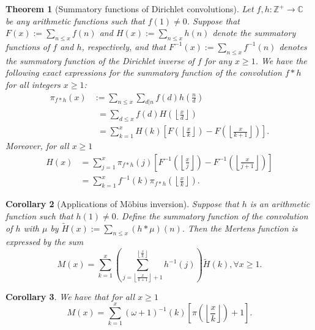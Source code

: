 \documentclass[11pt,reqno,a4letter]{article}
\numberwithin{figure}{section}
\numberwithin{table}{section}
\newcommand{\floor}[1]{\left\lfloor #1 \right\rfloor}
\newcommand{\Floor}[2]{\ensuremath{\left\lfloor \frac{#1}{#2} \right\rfloor}}
\theoremstyle{plain}
\newtheorem{theorem}{Theorem}
\newtheorem{cor}[theorem]{Corollary}
\numberwithin{theorem}{section}
\theoremstyle{definition}
\begin{document}
\begin{theorem}[Summatory functions of Dirichlet convolutions] 
\label{theorem_SummatoryFuncsOfDirCvls} 
Let $f,h: \mathbb{Z}^{+} \rightarrow \mathbb{C}$ be any arithmetic functions such that $f(1) \neq 0$. 
Suppose that $F(x) := \sum_{n \leq x} f(n)$ and $H(x) := \sum_{n \leq x} h(n)$ denote the summatory 
functions of $f$ and $h$, respectively, and that $F^{-1}(x) := \sum_{n \leq x} f^{-1}(n)$ 
denotes the summatory function of the 
Dirichlet inverse of $f$ for any $x \geq 1$. We have the following exact expressions for the 
summatory function of the convolution $f \ast h$ for all integers $x \geq 1$: 
\begin{align*} 
\pi_{f \ast h}(x) & := \sum_{n \leq x} \sum_{d|n} f(d) h\left(\frac{n}{d}\right) \\ 
     & \phantom{:}= \sum_{d \leq x} f(d) H\left(\Floor{x}{d}\right) \\ 
     & \phantom{:}= \sum_{k=1}^{x} H(k) \left[F\left(\Floor{x}{k}\right) - 
     F\left(\Floor{x}{k+1}\right)\right]. 
\end{align*} 
Moreover, for all $x \geq 1$ 
\begin{align*} 
H(x) & = \sum_{j=1}^{x} \pi_{f \ast h}(j) \left[F^{-1}\left(\Floor{x}{j}\right) - 
     F^{-1}\left(\Floor{x}{j+1}\right)\right] \\ 
     & = \sum_{k=1}^{x} f^{-1}(k) \pi_{f \ast h}\left(\Floor{x}{k}\right). 
\end{align*} 
\end{theorem} 

\begin{cor}[Applications of M\"obius inversion] 
\label{cor_CvlGAstMu} 
Suppose that $h$ is an arithmetic function such that 
$h(1) \neq 0$. Define the summatory function of 
the convolution of $h$ with $\mu$ by $\widetilde{H}(x) := \sum_{n \leq x} (h \ast \mu)(n)$. 
Then the Mertens function is expressed by the sum 
\[
M(x) = \sum_{k=1}^{x} \left(\sum_{j=\floor{\frac{x}{k+1}}+1}^{\floor{\frac{x}{k}}} h^{-1}(j)\right) 
     \widetilde{H}(k), \forall x \geq 1. 
\]
\end{cor} 

\begin{cor} 
\label{cor_Mx_gInvnPixk_formula} 
We have that for all $x \geq 1$ 
\begin{equation} 
\label{eqn_Mx_gInvnPixk_formula} 
M(x) = \sum_{k=1}^{x} (\omega+1)^{-1}(k) \left[\pi\left(\Floor{x}{k}\right) + 1\right]. 
\end{equation} 
\end{cor} 
\end{document}
